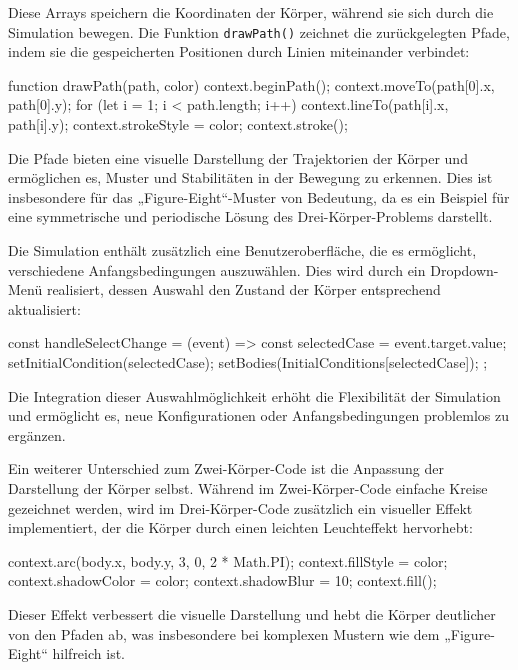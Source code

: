 \documentclass[a4paper,12pt,twoside]{article}
\begin{document}
Diese Arrays speichern die Koordinaten der Körper, während sie sich durch die Simulation bewegen. Die Funktion \texttt{drawPath()} zeichnet die zurückgelegten Pfade, indem sie die gespeicherten Positionen durch Linien miteinander verbindet:

\begin{javascript}
function drawPath(path, color) {
    context.beginPath();
    context.moveTo(path[0].x, path[0].y);
    for (let i = 1; i < path.length; i++) {
        context.lineTo(path[i].x, path[i].y);
    }
    context.strokeStyle = color;
    context.stroke();
}
\end{javascript}

Die Pfade bieten eine visuelle Darstellung der Trajektorien der Körper und ermöglichen es, Muster und Stabilitäten in der Bewegung zu erkennen. Dies ist insbesondere für das „Figure-Eight“-Muster von Bedeutung, da es ein Beispiel für eine symmetrische und periodische Lösung des Drei-Körper-Problems darstellt.

Die Simulation enthält zusätzlich eine Benutzeroberfläche, die es ermöglicht, verschiedene Anfangsbedingungen auszuwählen. Dies wird durch ein Dropdown-Menü realisiert, dessen Auswahl den Zustand der Körper entsprechend aktualisiert:

\begin{javascript}
const handleSelectChange = (event) => {
    const selectedCase = event.target.value;
    setInitialCondition(selectedCase);
    setBodies(InitialConditions[selectedCase]);
};
\end{javascript}

Die Integration dieser Auswahlmöglichkeit erhöht die Flexibilität der Simulation und ermöglicht es, neue Konfigurationen oder Anfangsbedingungen problemlos zu ergänzen.

Ein weiterer Unterschied zum Zwei-Körper-Code ist die Anpassung der Darstellung der Körper selbst. Während im Zwei-Körper-Code einfache Kreise gezeichnet werden, wird im Drei-Körper-Code zusätzlich ein visueller Effekt implementiert, der die Körper durch einen leichten Leuchteffekt hervorhebt:

\begin{javascript}
context.arc(body.x, body.y, 3, 0, 2 * Math.PI);
context.fillStyle = color;
context.shadowColor = color;
context.shadowBlur = 10;
context.fill();
\end{javascript}

Dieser Effekt verbessert die visuelle Darstellung und hebt die Körper deutlicher von den Pfaden ab, was insbesondere bei komplexen Mustern wie dem „Figure-Eight“ hilfreich ist.
\end{document}
